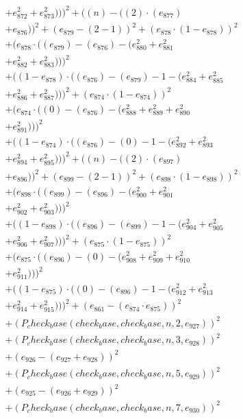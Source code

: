\documentclass[10pt, a4paper]{article}
\begin{document}
\begin{small}
\begin{align*}
& + e_{872}^{2} + e_{873}^{2})))^{2} + ((n) - ((2)  \cdot  (e_{877}) \\
& + e_{876}))^{2} + (e_{879} - (2 - 1))^{2} + (e_{878}  \cdot  (1 - e_{878}))^{2} \\
& + (e_{878}  \cdot  ((e_{879}) - (e_{876}) - (e_{880}^{2} + e_{881}^{2} \\
& + e_{882}^{2} + e_{883}^{2})))^{2} \\
& + ((1 - e_{878})  \cdot  ((e_{876}) - (e_{879}) - 1 - (e_{884}^{2} + e_{885}^{2} \\
& + e_{886}^{2} + e_{887}^{2})))^{2} + (e_{874}  \cdot  (1 - e_{874}))^{2} \\
& + (e_{874}  \cdot  ((0) - (e_{876}) - (e_{888}^{2} + e_{889}^{2} + e_{890}^{2} \\
& + e_{891}^{2})))^{2} \\
& + ((1 - e_{874})  \cdot  ((e_{876}) - (0) - 1 - (e_{892}^{2} + e_{893}^{2} \\
& + e_{894}^{2} + e_{895}^{2})))^{2} + ((n) - ((2)  \cdot  (e_{897}) \\
& + e_{896}))^{2} + (e_{899} - (2 - 1))^{2} + (e_{898}  \cdot  (1 - e_{898}))^{2} \\
& + (e_{898}  \cdot  ((e_{899}) - (e_{896}) - (e_{900}^{2} + e_{901}^{2} \\
& + e_{902}^{2} + e_{903}^{2})))^{2} \\
& + ((1 - e_{898})  \cdot  ((e_{896}) - (e_{899}) - 1 - (e_{904}^{2} + e_{905}^{2} \\
& + e_{906}^{2} + e_{907}^{2})))^{2} + (e_{875}  \cdot  (1 - e_{875}))^{2} \\
& + (e_{875}  \cdot  ((e_{896}) - (0) - (e_{908}^{2} + e_{909}^{2} + e_{910}^{2} \\
& + e_{911}^{2})))^{2} \\
& + ((1 - e_{875})  \cdot  ((0) - (e_{896}) - 1 - (e_{912}^{2} + e_{913}^{2} \\
& + e_{914}^{2} + e_{915}^{2})))^{2} + (e_{861} - (e_{874}  \cdot  e_{875}))^{2} \\
& + (P_check_base(check_base, check_base, n, 2, e_{927}))^{2} \\
& + (P_check_base(check_base, check_base, n, 3, e_{928}))^{2} \\
& + (e_{926} - (e_{927} + e_{928}))^{2} \\
& + (P_check_base(check_base, check_base, n, 5, e_{929}))^{2} \\
& + (e_{925} - (e_{926} + e_{929}))^{2} \\
& + (P_check_base(check_base, check_base, n, 7, e_{930}))^{2} \\

\end{align*}
\end{small}
\end{document}
